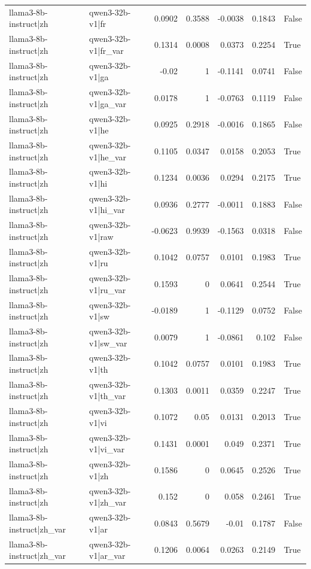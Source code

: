 \begin{table}
\begin{tabular}{l l r r r r l}
llama3-8b-instruct|zh & qwen3-32b-v1|fr & 0.0902 & 0.3588 & -0.0038 & 0.1843 & False \\
llama3-8b-instruct|zh & qwen3-32b-v1|fr_var & 0.1314 & 0.0008 & 0.0373 & 0.2254 & True \\
llama3-8b-instruct|zh & qwen3-32b-v1|ga & -0.02 & 1 & -0.1141 & 0.0741 & False \\
llama3-8b-instruct|zh & qwen3-32b-v1|ga_var & 0.0178 & 1 & -0.0763 & 0.1119 & False \\
llama3-8b-instruct|zh & qwen3-32b-v1|he & 0.0925 & 0.2918 & -0.0016 & 0.1865 & False \\
llama3-8b-instruct|zh & qwen3-32b-v1|he_var & 0.1105 & 0.0347 & 0.0158 & 0.2053 & True \\
llama3-8b-instruct|zh & qwen3-32b-v1|hi & 0.1234 & 0.0036 & 0.0294 & 0.2175 & True \\
llama3-8b-instruct|zh & qwen3-32b-v1|hi_var & 0.0936 & 0.2777 & -0.0011 & 0.1883 & False \\
llama3-8b-instruct|zh & qwen3-32b-v1|raw & -0.0623 & 0.9939 & -0.1563 & 0.0318 & False \\
llama3-8b-instruct|zh & qwen3-32b-v1|ru & 0.1042 & 0.0757 & 0.0101 & 0.1983 & True \\
llama3-8b-instruct|zh & qwen3-32b-v1|ru_var & 0.1593 & 0 & 0.0641 & 0.2544 & True \\
llama3-8b-instruct|zh & qwen3-32b-v1|sw & -0.0189 & 1 & -0.1129 & 0.0752 & False \\
llama3-8b-instruct|zh & qwen3-32b-v1|sw_var & 0.0079 & 1 & -0.0861 & 0.102 & False \\
llama3-8b-instruct|zh & qwen3-32b-v1|th & 0.1042 & 0.0757 & 0.0101 & 0.1983 & True \\
llama3-8b-instruct|zh & qwen3-32b-v1|th_var & 0.1303 & 0.0011 & 0.0359 & 0.2247 & True \\
llama3-8b-instruct|zh & qwen3-32b-v1|vi & 0.1072 & 0.05 & 0.0131 & 0.2013 & True \\
llama3-8b-instruct|zh & qwen3-32b-v1|vi_var & 0.1431 & 0.0001 & 0.049 & 0.2371 & True \\
llama3-8b-instruct|zh & qwen3-32b-v1|zh & 0.1586 & 0 & 0.0645 & 0.2526 & True \\
llama3-8b-instruct|zh & qwen3-32b-v1|zh_var & 0.152 & 0 & 0.058 & 0.2461 & True \\
llama3-8b-instruct|zh_var & qwen3-32b-v1|ar & 0.0843 & 0.5679 & -0.01 & 0.1787 & False \\
llama3-8b-instruct|zh_var & qwen3-32b-v1|ar_var & 0.1206 & 0.0064 & 0.0263 & 0.2149 & True \\

\end{tabular}
\end{table}
